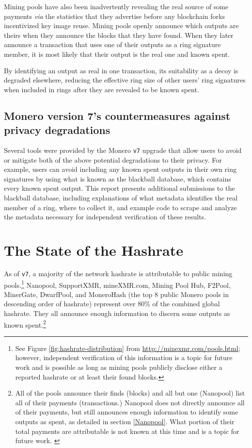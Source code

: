 \documentclass[notitlepage]{report}
\begin{document}
Mining pools have also been inadvertently revealing the real source of some payments \textit{via} the statistics that they advertise before any blockchain forks incentivized key image reuse.  Mining pools openly announce which outputs are theirs when they announce the blocks that they have found.  When they later announce a transaction that uses one of their outputs as a ring signature member, it is most likely that their output is the real one and known spent.

By identifying an output as real in one transaction, its suitability as a decoy is degraded elsewhere, reducing the effective ring size of other users' ring signatures when included in rings after they are revealed to be known spent.

\subsection{Monero version 7's countermeasures against privacy degradations} \label{effect}

Several tools were provided by the Monero \verb/v7/ upgrade that allow users to avoid or mitigate both of the above potential degradations to their privacy.  For example, users can avoid including any known spent outputs in their own ring signatures by using what is known as the blackball database, which contains every known spent output.  This report presents additional submissions to the blackball database, including explanations of what metadata identifies the real member of a ring, where to collect it, and example code to scrape and analyze the metadata necessary for independent verification of these results.

\section{The State of the Hashrate} \label{state-of-the-hashrate}

As of \verb/v7/, a majority of the network hashrate is attributable to public mining pools.\footnote{See Figure \ref{fig:hashrate-distribution} from \url{http://minexmr.com/pools.html}; however, independent verification of this information is a topic for future work and is possible as long as mining pools publicly disclose either a reported hashrate or at least their found blocks.}  Nanopool, SupportXMR, mineXMR.com, Mining Pool Hub, F2Pool, MinerGate, DwarfPool, and MoneroHash (the top 8 public Monero pools in descending order of hashrate) represent over 80\% of the combined global hashrate.  They all announce enough information to discern some outputs as known spent.\footnote{All of the pools announce their finds (blocks) and all but one (Nanopool) list all of their payments (transactions.)  Nanopool does not directly announce all of their payments, but still announces enough information to identify some outputs as spent, as detailed in section \ref{Nanopool}.  What portion of their total payments are attributable is not known at this time and is a topic for future work. \label{nanopool-surprisingly-not-the-worst}}
\end{document}
